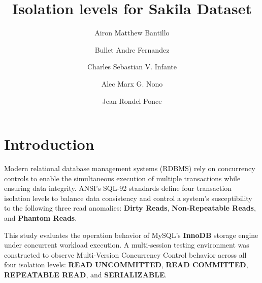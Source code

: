 \documentclass[sigconf, pbalance, nonacm]{acmart}
\begin{document}
\title{Isolation levels for Sakila Dataset}

\author{Airon Matthew Bantillo}

\author{Bullet Andre Fernandez}

\author{Charles Sebastian V. Infante}

\author{Alec Marx G. Nono}

\author{Jean Rondel Ponce}

\renewcommand{\shortauthors}{Fernandez et al.}

\maketitle
\section{Introduction}

Modern relational database management systems (RDBMS) rely on concurrency controls to enable the simultaneous execution of multiple transactions while ensuring data integrity. ANSI's SQL-92 standards define four transaction isolation levels to balance data consistency and control a system's susceptibility to the following three read anomalies: \textbf{Dirty Reads}, \textbf{Non-Repeatable Reads}, and \textbf{Phantom Reads}. 

This study evaluates the operation behavior of MySQL's \textbf{InnoDB} storage engine under concurrent workload execution. A multi-session testing environment was constructed to observe Multi-Version Concurrency Control behavior across all four isolation levels: \textbf{READ UNCOMMITTED}, \textbf{READ COMMITTED}, \textbf{REPEATABLE READ}, and \textbf{SERIALIZABLE}. 
\end{document}
